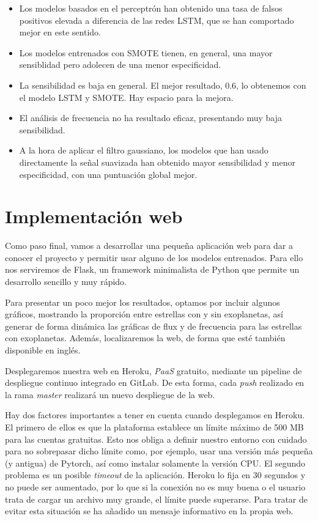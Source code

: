 \begin{itemize}
    \item Los modelos basados en el perceptrón han obtenido una tasa de falsos positivos elevada a diferencia de las redes LSTM, que se han comportado mejor en este sentido.
    \item Los modelos entrenados con SMOTE tienen, en general, una mayor sensiblidad pero adolecen de una menor especificidad.
    \item La sensibilidad es baja en general. El mejor resultado, 0.6, lo obtenemos con el modelo LSTM y SMOTE. Hay espacio para la mejora.
    \item El análisis de frecuencia no ha resultado eficaz, presentando muy baja sensibilidad.
    \item A la hora de aplicar el filtro gaussiano, los modelos que han usado directamente la señal suavizada han obtenido mayor sensibilidad y menor especificidad, con una puntuación global mejor.
\end{itemize}

\section{Implementación web}

Como paso final, vamos a desarrollar una pequeña aplicación web para dar a conocer el proyecto y permitir usar alguno de los modelos entrenados. Para ello nos serviremos de Flask, un framework minimalista de Python que permite un desarrollo sencillo y muy rápido.

Para presentar un poco mejor los resultados, optamos por incluir algunos gráficos, mostrando la proporción entre estrellas con y sin exoplanetas, así generar de forma dinámica las gráficas de flux y de frecuencia para las estrellas con exoplanetas. Además, localizaremos la web, de forma que esté también disponible en inglés.

Desplegaremos nuestra web en Heroku, \textit{PaaS} gratuito, mediante un pipeline de despliegue continuo integrado en GitLab. De esta forma, cada \textit{push} realizado en la rama \textit{master} realizará un nuevo despliegue de la web. 

Hay dos factores importantes a tener en cuenta cuando desplegamos en Heroku. El primero de ellos es que la plataforma establece un límite máximo de 500 MB para las cuentas gratuitas. Esto nos obliga a definir nuestro entorno con cuidado para no sobrepasar dicho límite como, por ejemplo, usar una versión más pequeña (y antigua) de Pytorch, así como instalar solamente la versión CPU. El segundo problema es un posible \textit{timeout} de la aplicación. Heroku lo fija en 30 segundos y no puede ser aumentado, por lo que si la conexión no es muy buena o el usuario trata de cargar un archivo muy grande, el límite puede superarse. Para tratar de evitar esta situación se ha añadido un mensaje informativo en la propia web.
